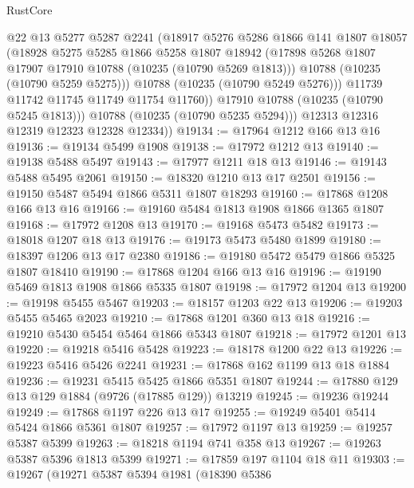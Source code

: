 \begin{lexlean}{RustCore}
\begin{coremodule}
                @22
                @13
                @5277
                @5287
                @2241
                (@18917
                  @5276
                  @5286
                  @1866
                  @141
                  @1807
                  @18057
                  (@18928
                    @5275
                    @5285
                    @1866
                    @5258
                    @1807
                    @18942
                    (@17898 @5268 @1807 @17907 @17910 @10788 (@10235 (@10790 @5269 @1813)))
                    @10788
                    (@10235 (@10790 @5259 @5275)))
                  @10788
                  (@10235 (@10790 @5249 @5276)))
                @11739
                @11742
                @11745
                @11749
                @11754
                @11760))
            @17910
            @10788
            (@10235 (@10790 @5245 @1813)))
          @10788
          (@10235 (@10790 @5235 @5294)))
        @12313
        @12316
        @12319
        @12323
        @12328
        @12334))
@19134 := @17964 @1212 @166 @13 @16
@19136 := @19134 @5499 @1908
@19138 := @17972 @1212 @13
@19140 := @19138 @5488 @5497
@19143 := @17977 @1211 @18 @13
@19146 := @19143 @5488 @5495 @2061
@19150 := @18320 @1210 @13 @17 @2501
@19156 := @19150 @5487 @5494 @1866 @5311 @1807 @18293
@19160 := @17868 @1208 @166 @13 @16
@19166 := @19160 @5484 @1813 @1908 @1866 @1365 @1807
@19168 := @17972 @1208 @13
@19170 := @19168 @5473 @5482
@19173 := @18018 @1207 @18 @13
@19176 := @19173 @5473 @5480 @1899
@19180 := @18397 @1206 @13 @17 @2380
@19186 := @19180 @5472 @5479 @1866 @5325 @1807 @18410
@19190 := @17868 @1204 @166 @13 @16
@19196 := @19190 @5469 @1813 @1908 @1866 @5335 @1807
@19198 := @17972 @1204 @13
@19200 := @19198 @5455 @5467
@19203 := @18157 @1203 @22 @13
@19206 := @19203 @5455 @5465 @2023
@19210 := @17868 @1201 @360 @13 @18
@19216 := @19210 @5430 @5454 @5464 @1866 @5343 @1807
@19218 := @17972 @1201 @13
@19220 := @19218 @5416 @5428
@19223 := @18178 @1200 @22 @13
@19226 := @19223 @5416 @5426 @2241
@19231 := @17868 @162 @1199 @13 @18 @1884
@19236 := @19231 @5415 @5425 @1866 @5351 @1807
@19244 := @17880 @129 @13 @129 @1884 (@9726 (@17885 @129)) @13219
@19245 := @19236 @19244
@19249 := @17868 @1197 @226 @13 @17
@19255 := @19249 @5401 @5414 @5424 @1866 @5361 @1807
@19257 := @17972 @1197 @13
@19259 := @19257 @5387 @5399
@19263 := @18218 @1194 @741 @358 @13
@19267 := @19263 @5387 @5396 @1813 @5399
@19271 := @17859 @197 @1104 @18 @11
@19303 := @19267
    (@19271
      @5387
      @5394
      @1981
      (@18390
        @5386

\end{coremodule}
\end{lexlean}

